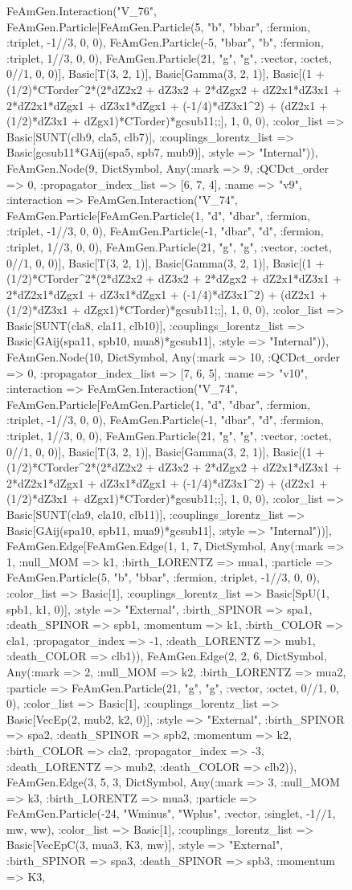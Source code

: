 \documentclass{revtex4}
\begin{document}
\begin{figure}[!htb]
\begin{center}
{FeAmGen.Interaction("V_76", FeAmGen.Particle[FeAmGen.Particle(5, "b", "bbar", :fermion, :triplet, -1//3, 0, 0), FeAmGen.Particle(-5, "bbar", "b", :fermion, :triplet, 1//3, 0, 0), FeAmGen.Particle(21, "g", "g", :vector, :octet, 0//1, 0, 0)], Basic[T(3, 2, 1)], Basic[Gamma(3, 2, 1)], Basic[(1 + (1/2)*CTorder^2*(2*dZ2x2 + dZ3x2 + 2*dZgx2 + dZ2x1*dZ3x1 + 2*dZ2x1*dZgx1 + dZ3x1*dZgx1 + (-1/4)*dZ3x1^2) + (dZ2x1 + (1/2)*dZ3x1 + dZgx1)*CTorder)*gcsub11;;], 1, 0, 0), :color_list => Basic[SUNT(clb9, cla5, clb7)], :couplings_lorentz_list => Basic[gcsub11*GAij(spa5, spb7, mub9)], :style => "Internal")), FeAmGen.Node(9, Dict{Symbol, Any}(:mark => 9, :QCDct_order => 0, :propagator_index_list => [6, 7, 4], :name => "v9", :interaction => FeAmGen.Interaction("V_74", FeAmGen.Particle[FeAmGen.Particle(1, "d", "dbar", :fermion, :triplet, -1//3, 0, 0), FeAmGen.Particle(-1, "dbar", "d", :fermion, :triplet, 1//3, 0, 0), FeAmGen.Particle(21, "g", "g", :vector, :octet, 0//1, 0, 0)], Basic[T(3, 2, 1)], Basic[Gamma(3, 2, 1)], Basic[(1 + (1/2)*CTorder^2*(2*dZ2x2 + dZ3x2 + 2*dZgx2 + dZ2x1*dZ3x1 + 2*dZ2x1*dZgx1 + dZ3x1*dZgx1 + (-1/4)*dZ3x1^2) + (dZ2x1 + (1/2)*dZ3x1 + dZgx1)*CTorder)*gcsub11;;], 1, 0, 0), :color_list => Basic[SUNT(cla8, cla11, clb10)], :couplings_lorentz_list => Basic[GAij(spa11, spb10, mua8)*gcsub11], :style => "Internal")), FeAmGen.Node(10, Dict{Symbol, Any}(:mark => 10, :QCDct_order => 0, :propagator_index_list => [7, 6, 5], :name => "v10", :interaction => FeAmGen.Interaction("V_74", FeAmGen.Particle[FeAmGen.Particle(1, "d", "dbar", :fermion, :triplet, -1//3, 0, 0), FeAmGen.Particle(-1, "dbar", "d", :fermion, :triplet, 1//3, 0, 0), FeAmGen.Particle(21, "g", "g", :vector, :octet, 0//1, 0, 0)], Basic[T(3, 2, 1)], Basic[Gamma(3, 2, 1)], Basic[(1 + (1/2)*CTorder^2*(2*dZ2x2 + dZ3x2 + 2*dZgx2 + dZ2x1*dZ3x1 + 2*dZ2x1*dZgx1 + dZ3x1*dZgx1 + (-1/4)*dZ3x1^2) + (dZ2x1 + (1/2)*dZ3x1 + dZgx1)*CTorder)*gcsub11;;], 1, 0, 0), :color_list => Basic[SUNT(cla9, cla10, clb11)], :couplings_lorentz_list => Basic[GAij(spa10, spb11, mua9)*gcsub11], :style => "Internal"))], FeAmGen.Edge[FeAmGen.Edge(1, 1, 7, Dict{Symbol, Any}(:mark => 1, :null_MOM => k1, :birth_LORENTZ => mua1, :particle => FeAmGen.Particle(5, "b", "bbar", :fermion, :triplet, -1//3, 0, 0), :color_list => Basic[1], :couplings_lorentz_list => Basic[SpU(1, spb1, k1, 0)], :style => "External", :birth_SPINOR => spa1, :death_SPINOR => spb1, :momentum => k1, :birth_COLOR => cla1, :propagator_index => -1, :death_LORENTZ => mub1, :death_COLOR => clb1)), FeAmGen.Edge(2, 2, 6, Dict{Symbol, Any}(:mark => 2, :null_MOM => k2, :birth_LORENTZ => mua2, :particle => FeAmGen.Particle(21, "g", "g", :vector, :octet, 0//1, 0, 0), :color_list => Basic[1], :couplings_lorentz_list => Basic[VecEp(2, mub2, k2, 0)], :style => "External", :birth_SPINOR => spa2, :death_SPINOR => spb2, :momentum => k2, :birth_COLOR => cla2, :propagator_index => -3, :death_LORENTZ => mub2, :death_COLOR => clb2)), FeAmGen.Edge(3, 5, 3, Dict{Symbol, Any}(:mark => 3, :null_MOM => k3, :birth_LORENTZ => mua3, :particle => FeAmGen.Particle(-24, "Wminus", "Wplus", :vector, :singlet, -1//1, mw, ww), :color_list => Basic[1], :couplings_lorentz_list => Basic[VecEpC(3, mua3, K3, mw)], :style => "External", :birth_SPINOR => spa3, :death_SPINOR => spb3, :momentum => K3, }
\end{center}
\end{figure}
\end{document}
